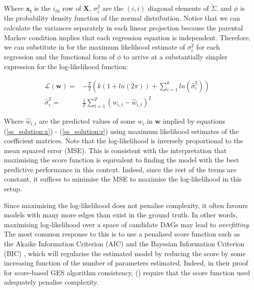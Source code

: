 \documentclass{article}
\begin{document}
Where $\mathbf{x_i}$ is the $i_{th}$ row of $\mathbf{X}$, $\sigma_i^2$ are the $(i, i)$ diagonal elements of $\tilde{\Sigma}$, and $\phi$ is the probability density function of the normal distribution. Notice that we can calculate the variances separately in each linear projection because the parental Markov condition implies that each regression equation is independent. Therefore, we can substitute in for the maximum likelihood estimate of $\sigma_i^2$ for each regression and the functional form of $\phi$ to arrive at a substantially simpler expression for the log-likelihood function:

\begin{align}
  \mathcal{L(\mathbf{w})} =& -\frac{T}{2} \left( 
  k \left( 1 + ln(2\pi) \right) +
  \sum_{i=1}^{k} ln(\hat{\sigma}_{i}^2)
  \right) \\
  \hat{\sigma}_{i}^2 =& \frac{1}{T} \sum_{t=1}^{T} (w_{i,t} - \hat{w}_{i,t})^2
\end{align}

Where $\hat{w}_{i,t}$ are the predicted values of some $w_i$ in $\mathbf{w}$ implied by equations (\ref{ss_solution:x}) - (\ref{ss_solution:z}) using maximum likelihood estimates of the coefficient matrices. Note that the log-likelihood is inversely proportional to the mean squared error (MSE). This is consistent with the interpretation that maximising the score function is equivalent to finding the model with the best predictive performance in this context. Indeed, since the rest of the terms are constant, it suffices to minimise the MSE to maximise the log-likelihood in this setup.

Since maximising the log-likelihood does not penalise complexity, it often favours models with many more edges than exist in the ground truth. In other words, maximising log-likelihood over a space of candidate DAGs may lead to \textit{overfitting}. The most common response to this is to use a penalised score function such as the Akaike Information Criterion (AIC) \parencite{akaike1974new} and the Bayesian Information Criterion (BIC) \parencite{schwarz1978estimating}, which will regularise the estimated model by reducing the score by some increasing function of the number of parameters estimated. Indeed, in their proof for score-based GES algorithm consistency, \citeauthor{chickering2002optimal} (\citeyear{chickering2002optimal}) require that the score function used adequately penalise complexity.
\end{document}
